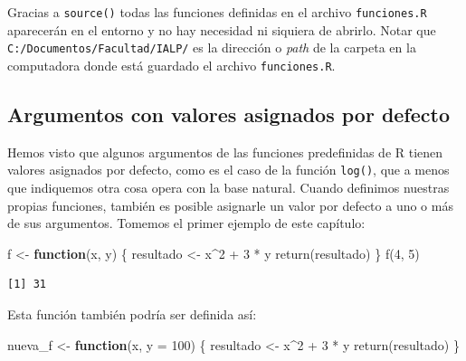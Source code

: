 \documentclass[
]{book}
\newenvironment{Shaded}{\begin{snugshade}}{\end{snugshade}}
\newcommand{\AttributeTok}[1]{\textcolor[rgb]{0.77,0.63,0.00}{#1}}
\newcommand{\ControlFlowTok}[1]{\textcolor[rgb]{0.13,0.29,0.53}{\textbf{#1}}}
\newcommand{\DecValTok}[1]{\textcolor[rgb]{0.00,0.00,0.81}{#1}}
\newcommand{\FunctionTok}[1]{\textcolor[rgb]{0.00,0.00,0.00}{#1}}
\newcommand{\NormalTok}[1]{#1}
\newcommand{\OtherTok}[1]{\textcolor[rgb]{0.56,0.35,0.01}{#1}}
\newcommand{\SpecialCharTok}[1]{\textcolor[rgb]{0.00,0.00,0.00}{#1}}
\begin{document}
Gracias a \texttt{source()} todas las funciones definidas en el archivo \texttt{funciones.R} aparecerán en el entorno y no hay necesidad ni siquiera de abrirlo. Notar que \texttt{C:/Documentos/Facultad/IALP/} es la dirección o \emph{path} de la carpeta en la computadora donde está guardado el archivo \texttt{funciones.R}.

\hypertarget{argumentos-con-valores-asignados-por-defecto}{%
\subsection{Argumentos con valores asignados por defecto}\label{argumentos-con-valores-asignados-por-defecto}}

Hemos visto que algunos argumentos de las funciones predefinidas de R tienen valores asignados por defecto, como es el caso de la función \texttt{log()}, que a menos que indiquemos otra cosa opera con la base natural. Cuando definimos nuestras propias funciones, también es posible asignarle un valor por defecto a uno o más de sus argumentos.
Tomemos el primer ejemplo de este capítulo:

\begin{Shaded}
\begin{Highlighting}[]
\NormalTok{f }\OtherTok{\textless{}{-}} \ControlFlowTok{function}\NormalTok{(x, y) \{}
\NormalTok{    resultado }\OtherTok{\textless{}{-}}\NormalTok{ x}\SpecialCharTok{\^{}}\DecValTok{2} \SpecialCharTok{+} \DecValTok{3} \SpecialCharTok{*}\NormalTok{ y}
    \FunctionTok{return}\NormalTok{(resultado)}
\NormalTok{\}}
\FunctionTok{f}\NormalTok{(}\DecValTok{4}\NormalTok{, }\DecValTok{5}\NormalTok{)}
\end{Highlighting}
\end{Shaded}

\begin{verbatim}
[1] 31
\end{verbatim}

Esta función también podría ser definida así:

\begin{Shaded}
\begin{Highlighting}[]
\NormalTok{nueva\_f }\OtherTok{\textless{}{-}} \ControlFlowTok{function}\NormalTok{(x, }\AttributeTok{y =} \DecValTok{100}\NormalTok{) \{}
\NormalTok{    resultado }\OtherTok{\textless{}{-}}\NormalTok{ x}\SpecialCharTok{\^{}}\DecValTok{2} \SpecialCharTok{+} \DecValTok{3} \SpecialCharTok{*}\NormalTok{ y}
    \FunctionTok{return}\NormalTok{(resultado)}
\NormalTok{\}}
\end{Highlighting}
\end{Shaded}
\end{document}
